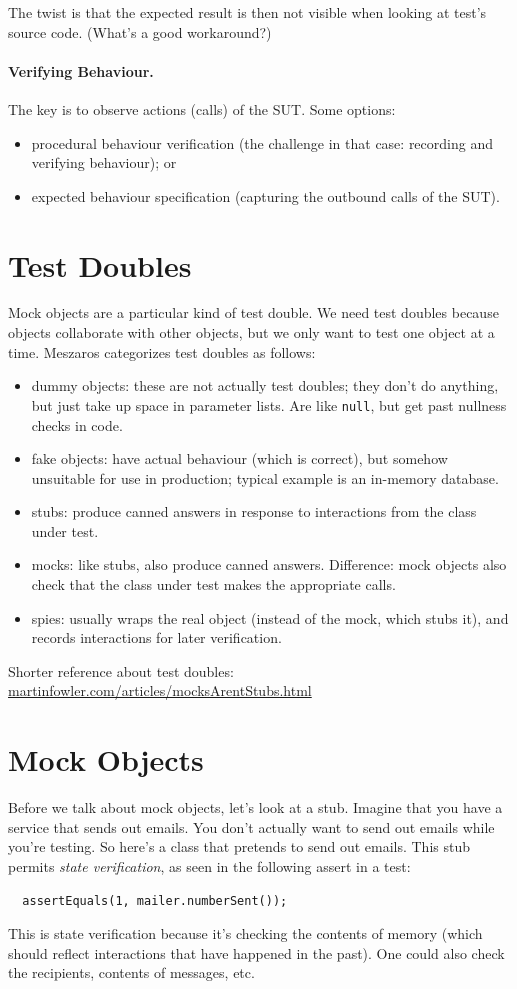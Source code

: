 \documentclass[11pt]{article}
\begin{document}
The twist is that the expected result is then not visible when looking
at test's source code. (What's a good workaround?)

\paragraph{Verifying Behaviour.} The key is to observe actions
(calls) of the SUT. Some options:
\begin{itemize}[noitemsep]
\item procedural behaviour verification
  (the challenge in that case: recording and verifying behaviour); or
\item expected behaviour specification
  (capturing the outbound calls of the SUT).
\end{itemize}

\section*{Test Doubles}
Mock objects are a particular kind of test double. We need test doubles
because objects collaborate with other objects, but we only want to test
one object at a time.
Meszaros categorizes test doubles as follows:
\begin{itemize}[noitemsep]
    \item dummy objects: these are not actually test doubles; they don't do anything, but just take up space in parameter lists. Are like {\tt null}, but get past nullness checks in code.
    \item fake objects: have actual behaviour (which is correct), but somehow unsuitable for use in production; typical example is an in-memory database.
    \item stubs: produce canned answers in response to interactions from the class under test.
    \item mocks: like stubs, also produce canned answers. Difference: mock objects also check that the class under test makes the appropriate calls.
    \item spies: usually wraps the real object (instead of the mock, which stubs it), and records interactions for later verification.
\end{itemize}
Shorter reference about test doubles: \url{martinfowler.com/articles/mocksArentStubs.html}

\section*{Mock Objects}
Before we talk about mock objects, let's look at a stub. Imagine that you have a service that
sends out emails. You don't actually want to send out emails while you're testing. So here's
a class that pretends to send out emails.
This stub permits \emph{state verification}, as seen in the following assert in a test:
\begin{lstlisting}
  assertEquals(1, mailer.numberSent());
\end{lstlisting}
This is state verification because it's checking the contents of
memory (which should reflect interactions that have happened in the
past). One could also check the recipients, contents of messages, etc.
\end{document}

